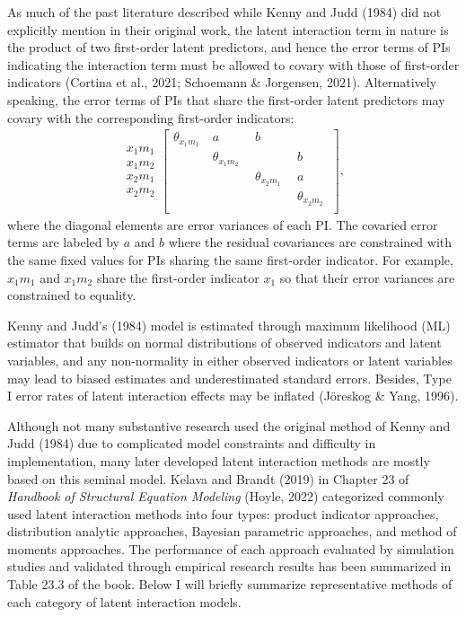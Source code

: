 \documentclass[
  11pt,
  man]{apa6}
\begin{document}
As much of the past literature described while Kenny and Judd (1984) did not explicitly mention in their original work, the latent interaction term in nature is the product of two first-order latent predictors, and hence the error terms of PIs indicating the interaction term must be allowed to covary with those of first-order indicators (Cortina et al., 2021; Schoemann \& Jorgensen, 2021). Alternatively speaking, the error terms of PIs that share the first-order latent predictors may covary with the corresponding first-order indicators:
\begin{align}
\begin{matrix}
x_{1}m_{1} \\ x_{1}m_{2} \\ x_{2}m_{1} \\ x_{2}m_{2} 
\end{matrix}
\begin{bmatrix}
\theta_{x_{1}m_{1}} & \ a \ & \ b \ \\
\ & \ \theta_{x_{1}m_{2}} \ & \ & \ b \ \\
\ & \ & \ \theta_{x_{2}m_{1}} \ & \ a \ \\
\ & \ & \ & \ \theta_{x_{2}m_{2}} \ \\
\end{bmatrix},
\end{align}
where the diagonal elements are error variances of each PI. The covaried error terms are labeled by \(a\) and \(b\) where the residual covariances are constrained with the same fixed values for PIs sharing the same first-order indicator. For example, \(x_{1}m_{1}\) and \(x_{1}m_{2}\) share the first-order indicator \(x_{1}\) so that their error variances are constrained to equality.

Kenny and Judd's (1984) model is estimated through maximum likelihood (ML) estimator that builds on normal distributions of observed indicators and latent variables, and any non-normality in either observed indicators or latent variables may lead to biased estimates and underestimated standard errors. Besides, Type I error rates of latent interaction effects may be inflated (Jöreskog \& Yang, 1996).

Although not many substantive research used the original method of Kenny and Judd (1984) due to complicated model constraints and difficulty in implementation, many later developed latent interaction methods are mostly based on this seminal model. Kelava and Brandt (2019) in Chapter 23 of \emph{Handbook of Structural Equation Modeling} (Hoyle, 2022) categorized commonly used latent interaction methods into four types: product indicator approaches, distribution analytic approaches, Bayesian parametric approaches, and method of moments approaches. The performance of each approach evaluated by simulation studies and validated through empirical research results has been summarized in Table 23.3 of the book. Below I will briefly summarize representative methods of each category of latent interaction models.
\end{document}
